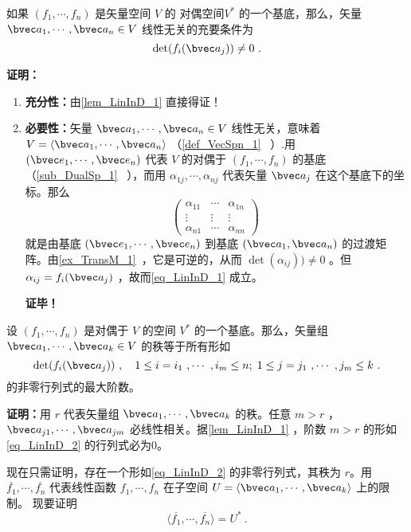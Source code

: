 \begin{lemma}{}\label{lem_LinInD_2}
如果 $(f_1,\cdots,f_n)$ 是矢量空间 $V$ 的 对偶空间$V^*$ 的一个基底，那么，矢量 $\bvec a_1,\cdots,\bvec a_n\in V$ 线性无关的充要条件为
\begin{equation}\label{eq_LinInD_1}
\det(f_i(\bvec a_j))\neq 0~.
\end{equation}
\end{lemma}
\textbf{证明：} \begin{enumerate}
\item \textbf{充分性：}由\autoref{lem_LinInD_1} 直接得证！
\item \textbf{必要性：}矢量 $\bvec a_1,\cdots,\bvec a_n\in V$ 线性无关，意味着 $V=\langle\bvec a_1,\cdots,\bvec a_n\rangle$ （\autoref{def_VecSpn_1}~ ）.用 $(\bvec e_1,\cdots,\bvec e_n)$ 代表 $V$ 的对偶于 $(f_1,\cdots,f_n)$ 的基底（\autoref{sub_DualSp_1}~ ），而用 $\alpha_{1j},\cdots,\alpha_{nj}$ 代表矢量 $\bvec a_j$ 在这个基底下的坐标。那么
\begin{equation}
\begin{pmatrix}
\alpha_{11}&\cdots&\alpha_{1n}\\
\vdots&\vdots&\vdots\\
\alpha_{n1}&\cdots&\alpha_{nn}
\end{pmatrix}~
\end{equation}
就是由基底 $(\bvec e_1,\cdots,\bvec e_n)$ 到基底 $(\bvec a_1,\bvec a_n)$ 的过渡矩阵。由\autoref{ex_TransM_1}~，它是可逆的，从而 $\det(\alpha_{ij}))\neq0$ 。但 $\alpha_{ij}=f_i(\bvec a_j)$ ，故而\autoref{eq_LinInD_1} 成立。

\textbf{证毕！} 
\end{enumerate}
\begin{theorem}{}
设 $(f_1,\cdots,f_n)$ 是对偶于 $V$ 的空间 $V^*$ 的一个基底。那么，矢量组 $\bvec a_1,\cdots,\bvec a_k\in V$ 的秩等于所有形如
\begin{equation}\label{eq_LinInD_2}
\det(f_i(\bvec a_j))~,\quad 1\leq i=i_1~,\cdots~ ,i_m\leq n;\;1\leq j=j_1~,\cdots~,j_m\leq k~.
\end{equation}
的非零行列式的最大阶数。
\end{theorem}
\textbf{证明：}用 $r$ 代表矢量组 $\bvec a_1,\cdots,\bvec a_k$ 的秩。任意 $m>r$ ，$\bvec a_{j1},\cdots,\bvec a_{jm}$ 必线性相关。据\autoref{lem_LinInD_1} ，阶数 $m>r$ 的形如\autoref{eq_LinInD_2} 的行列式必为0。

现在只需证明，存在一个形如\autoref{eq_LinInD_2} 的非零行列式，其秩为 $r$。用 $\overline{f_1},\cdots,\overline{f_n}$ 代表线性函数 $f_1,\cdots,f_n$ 在子空间 $U=\langle\bvec a_1,\cdots,\bvec a_k\rangle$ 上的限制。
现要证明
\begin{equation}\label{eq_LinInD_3}
\langle\overline{f_1},\cdots,\overline{f_n}\rangle=U^*~.
\end{equation}

